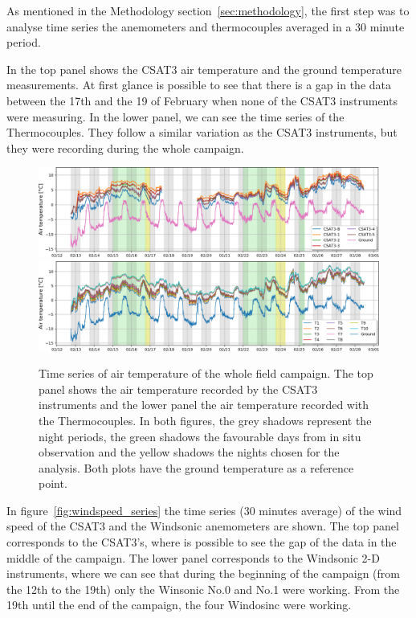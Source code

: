 As mentioned in the Methodology section~\ref{sec:methodology}, the first step was to analyse time series the anemometers and thermocouples averaged in a 30 minute period. 

In the top panel shows the CSAT3 air temperature and the ground temperature measurements. At first glance is possible to see that there is a gap in the data between the 17th and the 19 of February when none of the CSAT3 instruments were measuring. In the lower panel, we can see the time series of the Thermocouples. They follow a similar variation as the CSAT3 instruments, but they were recording during the whole campaign. 

\begin{figure}
  \centering
  {
  \includegraphics[width=1\textwidth]{fig/chapter_4/csat_temp_series.png}\\
   \includegraphics[width=1\textwidth]{fig/chapter_4/TC_temp_series.png}
   }
  \caption{Time series of air temperature of the whole field campaign. The top panel shows the air temperature recorded by the CSAT3 instruments and the lower panel the air temperature recorded with the Thermocouples. In both figures, the grey shadows represent the night periods, the green shadows the favourable days from in situ observation and the yellow shadows the nights chosen for the analysis. Both plots have the ground temperature as a reference point.}
  \label{fig:temp_series}
\end{figure}

In figure~\ref{fig:windspeed_series} the time series (30 minutes average) of the wind speed of the CSAT3 and the Windsonic anemometers are shown. The top panel corresponds to the CSAT3's, where is possible to see the gap of the data in the middle of the campaign. The lower panel corresponds to the Windsonic 2-D instruments, where we can see that during the beginning of the campaign (from the 12th to the 19th) only the Winsonic No.0 and No.1 were working. From the 19th until the end of the campaign, the four Windosinc were working. 

